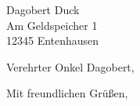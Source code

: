 \documentclass[12pt,ngerman]{scrlttr2}
\begin{document}
\begin{letter}{Dagobert Duck \\ Am Geldspeicher 1 \\ 12345 Entenhausen}
\opening{Verehrter Onkel Dagobert,}

\blindtext[3]

\closing{Mit freundlichen Grüßen,}
\end{letter}
\end{document}
